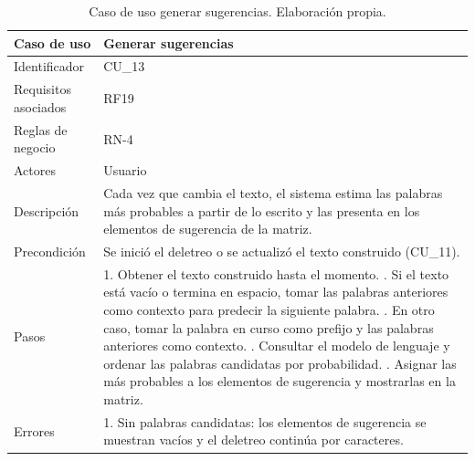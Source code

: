 \begin{table}[H]
\centering
\small
\begin{tabularx}{\textwidth}{|L{3.0cm}|Y|}
\hline
\textbf{Caso de uso} & \textbf{Generar sugerencias} \\
\hline
Identificador & CU\_13 \\
\hline
Requisitos asociados & RF19 \\
\hline
Reglas de negocio & RN-4 \\
\hline
Actores & Usuario \\
\hline
Descripción & Cada vez que cambia el texto, el sistema estima las palabras más probables a partir de lo escrito y las presenta en los elementos de sugerencia de la matriz. \\
\hline
Precondición & Se inició el deletreo o se actualizó el texto construido (CU\_11). \\
\hline
Pasos & 1. Obtener el texto construido hasta el momento. . Si el texto está vacío o termina en espacio, tomar las palabras anteriores como contexto para predecir la siguiente palabra. . En otro caso, tomar la palabra en curso como prefijo y las palabras anteriores como contexto. . Consultar el modelo de lenguaje y ordenar las palabras candidatas por probabilidad. . Asignar las más probables a los elementos de sugerencia y mostrarlas en la matriz. \\
\hline
Errores & 1. Sin palabras candidatas: los elementos de sugerencia se muestran vacíos y el deletreo continúa por caracteres. \\
\hline
\end{tabularx}
\caption{Caso de uso generar sugerencias. Elaboración propia.}
\label{tab:cu13}
\end{table}


